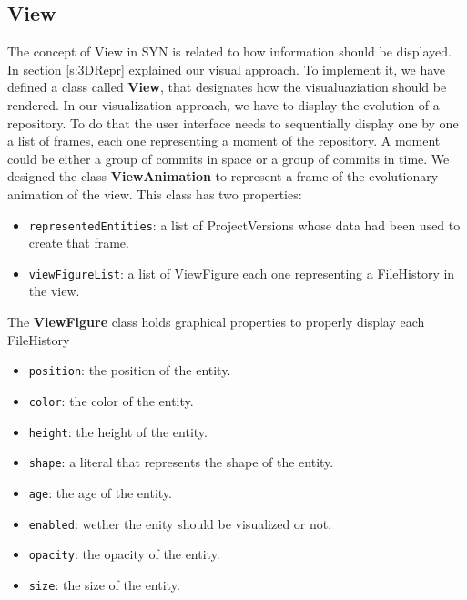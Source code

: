 \subsection*{View}
\label{s:view_impl}
The concept of View in SYN is related to how information should be displayed. In section \ref{s:3DRepr} explained our visual approach. To implement it, we have defined a class called \textbf{View}, that designates how the visualuaziation should be rendered. 
In our visualization approach, we have to display the evolution of a repository. To do that the user interface needs to sequentially display one by one a list of frames, each one representing a moment of the repository. A moment could be either a group of commits in space or a group of commits in time.
We designed the class \textbf{ViewAnimation} to represent a frame of the evolutionary animation of the view. This class has two properties:
\begin{itemize}
    \item \texttt{representedEntities}: a list of ProjectVersions whose data had been used to create that frame.
    \item \texttt{viewFigureList}: a list of ViewFigure each one representing a FileHistory in the view.
\end{itemize}

The \textbf{ViewFigure} class holds graphical properties to properly display each FileHistory
\begin{itemize}
    \item \texttt{position}: the position of the entity.
    \item \texttt{color}: the color of the entity.
    \item \texttt{height}: the height of the entity.
    \item \texttt{shape}: a literal that represents the shape of the entity. 
    \item \texttt{age}: the age of the entity.
    \item \texttt{enabled}: wether the enity should be visualized or not.
    \item \texttt{opacity}: the opacity of the entity.
    \item \texttt{size}: the size of the entity.
\end{itemize}

